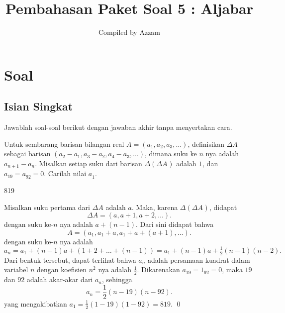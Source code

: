 \documentclass[11pt]{scrartcl}
\begin{document}
	\title{Pembahasan Paket Soal 5 : Aljabar} %
	\date{}
	\author{Compiled by Azzam}
	\maketitle
	\newpage
	
	\section{Soal}
\subsection{Isian Singkat}
Jawablah soal-soal berikut dengan jawaban akhir tanpa menyertakan cara.

	\begin{soalbaru}
		Untuk sembarang barisan bilangan real $A=(a_1,a_2,a_3,\ldots)$, definisikan $\Delta A^{}_{}$ sebagai barisan $(a_2-a_1,a_3-a_2,a_4-a_3,\ldots)$, dimana suku ke $n$ nya adalah  $a_{n+1}-a_n^{}$. Misalkan setiap suku dari barisan  $\Delta(\Delta A^{}_{})$ adalah $1^{}_{}$, dan $a_{19}=a_{92}^{}=0$. Carilah nilai $a_1^{}$.
		
		\begin{jawaban}
		819
		\end{jawaban}
		\begin{solusi}
		Misalkan suku pertama dari $\Delta A$ adalah $a$. Maka, karena $\Delta(\Delta A^{}_{})$, didapat $$\Delta A = (a,a+1,a+2,\dots).$$ dengan suku ke-$n$ nya adalah $a+(n-1)$. Dari sini didapat bahwa $$A = (a_1,a_1+a,a_1+a+(a+1),\dots).$$ dengan suku ke-$n$ nya adalah $a_n=a_1+(n-1)a+(1+2+\dots+(n-1))=a_1+(n-1)a+\frac{1}{2}(n-1)(n-2).
		$
		Dari bentuk tersebut, dapat terlihat bahwa $a_n$ adalah persamaan kuadrat dalam variabel $n$ dengan koefisien $n^2$ nya adalah $\frac12$. Dikarenakan $a_{19}=1_{92}=0$, maka $19$ dan $92$ adalah akar-akar dari $a_n$, sehingga $$a_n=\frac12(n-19)(n-92).$$ yang mengakibatkan $a_1=\frac12(1-19)(1-92)=819.$ \qed
		\end{solusi}
	\end{soalbaru}
	
\end{document}
